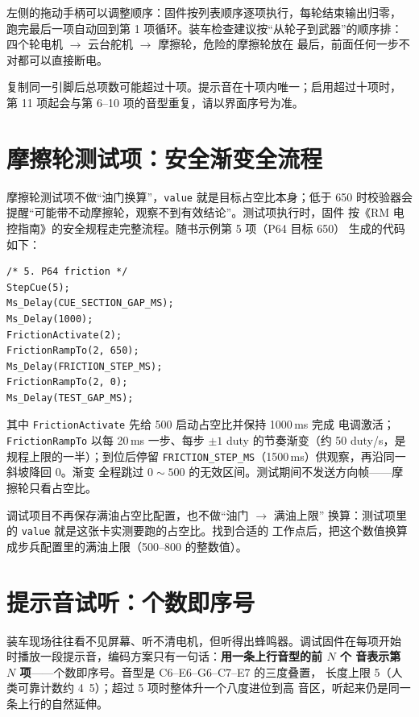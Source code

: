 左侧的拖动手柄可以调整顺序：固件按列表顺序逐项执行，每轮结束输出归零，
跑完最后一项自动回到第 1 项循环。装车检查建议按“从轮子到武器”的顺序排：
四个轮电机 $\rightarrow$ 云台舵机 $\rightarrow$ 摩擦轮，危险的摩擦轮放在
最后，前面任何一步不对都可以直接断电。

\begin{note}
复制同一引脚后总项数可能超过十项。提示音在十项内唯一；启用超过十项时，
第 11 项起会与第 6--10 项的音型重复，请以界面序号为准。
\end{note}

\section{摩擦轮测试项：安全渐变全流程}

摩擦轮测试项不做“油门换算”，\texttt{value} 就是目标占空比本身；低于 650
时校验器会提醒“可能带不动摩擦轮，观察不到有效结论”。测试项执行时，固件
按《RM 电控指南》的安全规程走完整流程。随书示例第 5 项（P64 目标 650）
生成的代码如下：

\begin{lstlisting}[style=pieblockc,
  caption={摩擦轮测试项的生成代码（\texttt{debug-checklist.c} 节选）},
  label={lst:ch06-friction}]
/* 5. P64 friction */
StepCue(5);
Ms_Delay(CUE_SECTION_GAP_MS);
Ms_Delay(1000);
FrictionActivate(2);
FrictionRampTo(2, 650);
Ms_Delay(FRICTION_STEP_MS);
FrictionRampTo(2, 0);
Ms_Delay(TEST_GAP_MS);
\end{lstlisting}

其中 \texttt{FrictionActivate} 先给 500 启动占空比并保持 1000\,ms 完成
电调激活；\texttt{FrictionRampTo} 以每 20\,ms 一步、每步 $\pm1$ duty
的节奏渐变（约 50 duty/s，是规程上限的一半）；到位后停留
\texttt{FRICTION\_STEP\_MS}（1500\,ms）供观察，再沿同一斜坡降回 0。渐变
全程跳过 $0\sim500$ 的无效区间。测试期间不发送方向帧——摩擦轮只看占空比。

\begin{note}
调试项目不再保存满油占空比配置，也不做“油门 $\rightarrow$ 满油上限”
换算：测试项里的 \texttt{value} 就是这张卡实测要跑的占空比。找到合适的
工作点后，把这个数值换算成步兵配置里的满油上限（500--800 的整数值）。
\end{note}

\section{提示音试听：个数即序号}

装车现场往往看不见屏幕、听不清电机，但听得出蜂鸣器。调试固件在每项开始
时播放一段提示音，编码方案只有一句话：\textbf{用一条上行音型的前 $N$ 个
音表示第 $N$ 项}——个数即序号。音型是 C6--E6--G6--C7--E7 的三度叠置，
长度上限 5（人类可靠计数约 4~5）；超过 5 项时整体升一个八度进位到高
音区，听起来仍是同一条上行的自然延伸。

